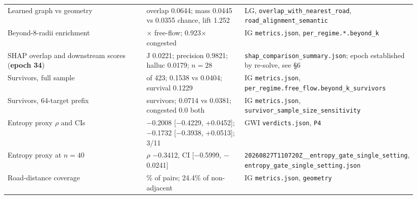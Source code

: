 \documentclass{article}
\begin{document}
\begin{tabular}{@{}>{\raggedright\arraybackslash}p{0.34\linewidth}>{\raggedright\arraybackslash}p{0.24\linewidth}>{\raggedright\arraybackslash}p{0.36\linewidth}@{}}
Learned graph vs geometry & overlap 0.0644; mass 0.0445 vs 0.0355 chance, lift 1.252 & LG, \texttt{overlap\_with\_nearest\_road}, \texttt{road\_alignment\_semantic} \\
Beyond-8-radii enrichment & 0.57$\times$ free-flow; 0.923$\times$ congested & IG \texttt{metrics.json}, \texttt{per\_regime.*.beyond\_k} \\
SHAP overlap and downstream scores (\textbf{epoch 34}) & J 0.0221; precision 0.9821; halluc 0.0179; $n{=}28$ & \texttt{shap\_comparison\_summary.json}; epoch established by re-solve, see \S6 \\
Survivors, full sample & 52 of 423; 0.1538 vs 0.0404; survival 0.1229 & IG \texttt{metrics.json}, \texttt{per\_regime.free\_flow.\allowbreak beyond\_k\_survivors} \\
Survivors, 64-target prefix & 14 survivors; 0.0714 vs 0.0381; congested 0.0 both & IG \texttt{metrics.json}, \texttt{survivor\_sample\_\allowbreak size\_sensitivity} \\
Entropy proxy $\rho$ and CIs & $-$0.2008 [$-$0.4229, +0.0452]; $-$0.1732 [$-$0.3938, +0.0513]; 3/11 & GWI \texttt{verdicts.json}, \texttt{P4} \\
Entropy proxy at $n{=}40$ & $\rho$ $-$0.3412, CI [$-$0.5999, $-$0.0241] & \texttt{20260827T110720Z\_\_entropy\_\allowbreak gate\_single\_setting}, \texttt{entropy\_gate\_\allowbreak single\_setting.json} \\
Road-distance coverage & 27.1\% of pairs; 24.4\% of non-adjacent & IG \texttt{metrics.json}, \texttt{geometry} \\
\bottomrule
\end{tabular}
\normalsize
\end{document}
